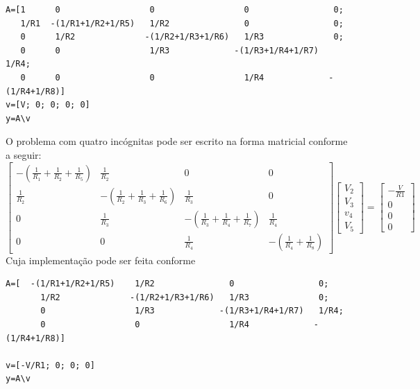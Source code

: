\begin{Answer}
\begin{tiny}
\begin{verbatim}
A=[1      0                  0                  0                 0;
   1/R1  -(1/R1+1/R2+1/R5)   1/R2               0                 0;
   0      1/R2              -(1/R2+1/R3+1/R6)   1/R3              0;
   0      0                  1/R3             -(1/R3+1/R4+1/R7)   1/R4;
   0      0                  0                  1/R4             -(1/R4+1/R8)]
v=[V; 0; 0; 0; 0]
y=A\v
\end{verbatim}
O problema com quatro incógnitas pode ser escrito na forma matricial conforme a seguir:
$$\left[\begin{array}{cccc}
-\left(\frac{1}{R_1}+\frac{1}{R_2}+\frac{1}{R_5}\right)&\frac{1}{R_2}&0&0\\[.5cm]
\frac{1}{R_2}&-\left(\frac{1}{R_2}+\frac{1}{R_3}+\frac{1}{R_6}\right)&\frac{1}{R_3}&0\\[.5cm]
0&\frac{1}{R_3}&-\left(\frac{1}{R_3}+\frac{1}{R_4}+\frac{1}{R_7}\right)&\frac{1}{R_4}\\[.5cm]
0&0&\frac{1}{R_4}&-\left(\frac{1}{R_4}+\frac{1}{R_8}\right)
\end{array}
\right]
\left[\begin{array}{c}
V_2\\[.65cm]
V_3\\[.65cm]
v_4\\[.65cm]
V_5
\end{array}
\right]=
\left[\begin{array}{c}
-\frac{V}{R1}\\[.65cm]
0\\[.65cm]
0\\[.65cm]
0
\end{array}
\right] $$
Cuja implementação pode ser feita conforme
\begin{verbatim}
A=[  -(1/R1+1/R2+1/R5)    1/R2               0                 0;
       1/R2              -(1/R2+1/R3+1/R6)   1/R3              0;
       0                  1/R3             -(1/R3+1/R4+1/R7)   1/R4;
       0                  0                  1/R4             -(1/R4+1/R8)]

v=[-V/R1; 0; 0; 0]
y=A\v
\end{verbatim}    
  \end{tiny}
\end{Answer}
\fi

